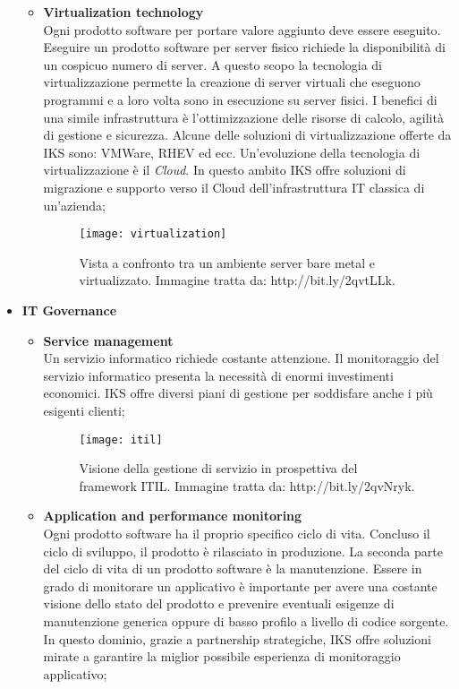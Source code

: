\begin{itemize}
\begin{itemize}
		\item \textbf{Virtualization technology}\\
	 	Ogni prodotto software per portare valore aggiunto deve essere 
		eseguito. Eseguire un prodotto software per server fisico 
		richiede la disponibilità di un cospicuo numero di server. 
		A questo scopo la tecnologia di virtualizzazione permette la 
		creazione di server virtuali che eseguono programmi e a loro 
		volta sono in esecuzione su server fisici. I benefici di una 
		simile infrastruttura è l'ottimizzazione delle risorse di calcolo, 
		agilità di gestione e sicurezza. Alcune delle soluzioni di 
		virtualizzazione offerte da IKS sono: VMWare, RHEV ed ecc. 
		Un'evoluzione della tecnologia di virtualizzazione è il \emph{Cloud}. 
		In questo ambito IKS offre soluzioni di migrazione e supporto verso il 
		Cloud dell'infrastruttura IT classica di un'azienda;  
		\begin{figure}[htbp]
			\begin{center}
				\texttt{[image: virtualization]}
				\caption{Vista a confronto tra un ambiente 
				server bare metal e virtualizzato. 
				Immagine tratta da: http://bit.ly/2qvtLLk.}
			\end{center}
		\end{figure}
 	\end{itemize}

	\item \textbf{IT Governance}\\
	\begin{itemize}
		\item \textbf{Service management}\\
		Un servizio informatico richiede costante attenzione. Il monitoraggio 
		del servizio informatico presenta la necessità di enormi investimenti 
		economici. IKS offre diversi piani di gestione per soddisfare 
		anche i più esigenti clienti;
	    
	    \begin{figure}[htbp]
	    	\begin{center}
	    		\texttt{[image: itil]}
	    		\caption{Visione della gestione di servizio in 
				prospettiva del \gls{framework} ITIL. Immagine tratta da: 
				http://bit.ly/2qvNryk.}
	    	\end{center}
	    \end{figure}
	    
	    \newpage  
		\item \textbf{Application and performance monitoring}\\ 
		Ogni prodotto software ha il proprio specifico ciclo di vita. 
		Concluso il ciclo di sviluppo, il prodotto è rilasciato in 
		produzione. La seconda parte del ciclo di vita di un prodotto 
		software è la manutenzione. Essere in grado di monitorare un 
		applicativo è importante per avere una costante visione dello 
		stato del prodotto e prevenire eventuali esigenze di 
		manutenzione generica oppure di basso profilo a livello di 
		codice sorgente. In questo dominio, grazie a partnership 
		strategiche, IKS offre soluzioni mirate a garantire la miglior 
		possibile esperienza di monitoraggio applicativo;
		

\end{itemize}
\end{itemize}
